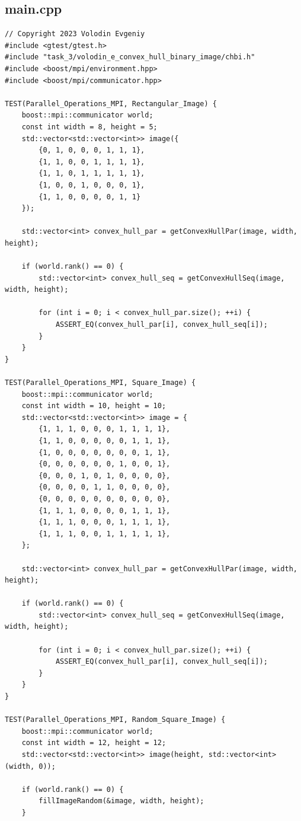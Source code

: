 \documentclass[a4paper, 12pt]{extarticle}
\begin{document}
\subsection*{main.cpp}
\begin{verbatim}
// Copyright 2023 Volodin Evgeniy
#include <gtest/gtest.h>
#include "task_3/volodin_e_convex_hull_binary_image/chbi.h"
#include <boost/mpi/environment.hpp>
#include <boost/mpi/communicator.hpp>

TEST(Parallel_Operations_MPI, Rectangular_Image) {
	boost::mpi::communicator world;
	const int width = 8, height = 5;
	std::vector<std::vector<int>> image({
		{0, 1, 0, 0, 0, 1, 1, 1},
		{1, 1, 0, 0, 1, 1, 1, 1},
		{1, 1, 0, 1, 1, 1, 1, 1},
		{1, 0, 0, 1, 0, 0, 0, 1},
		{1, 1, 0, 0, 0, 0, 1, 1}
	});
	
	std::vector<int> convex_hull_par = getConvexHullPar(image, width, height);
	
	if (world.rank() == 0) {
		std::vector<int> convex_hull_seq = getConvexHullSeq(image, width, height);
		
		for (int i = 0; i < convex_hull_par.size(); ++i) {
			ASSERT_EQ(convex_hull_par[i], convex_hull_seq[i]);
		}
	}
}

TEST(Parallel_Operations_MPI, Square_Image) {
	boost::mpi::communicator world;
	const int width = 10, height = 10;
	std::vector<std::vector<int>> image = {
		{1, 1, 1, 0, 0, 0, 1, 1, 1, 1},
		{1, 1, 0, 0, 0, 0, 0, 1, 1, 1},
		{1, 0, 0, 0, 0, 0, 0, 0, 1, 1},
		{0, 0, 0, 0, 0, 0, 1, 0, 0, 1},
		{0, 0, 0, 1, 0, 1, 0, 0, 0, 0},
		{0, 0, 0, 0, 1, 1, 0, 0, 0, 0},
		{0, 0, 0, 0, 0, 0, 0, 0, 0, 0},
		{1, 1, 1, 0, 0, 0, 0, 1, 1, 1},
		{1, 1, 1, 0, 0, 0, 1, 1, 1, 1},
		{1, 1, 1, 0, 0, 1, 1, 1, 1, 1},
	};
	
	std::vector<int> convex_hull_par = getConvexHullPar(image, width, height);
	
	if (world.rank() == 0) {
		std::vector<int> convex_hull_seq = getConvexHullSeq(image, width, height);
		
		for (int i = 0; i < convex_hull_par.size(); ++i) {
			ASSERT_EQ(convex_hull_par[i], convex_hull_seq[i]);
		}
	}
}

TEST(Parallel_Operations_MPI, Random_Square_Image) {
	boost::mpi::communicator world;
	const int width = 12, height = 12;
	std::vector<std::vector<int>> image(height, std::vector<int>(width, 0));
	
	if (world.rank() == 0) {
		fillImageRandom(&image, width, height);
	}
	

\end{verbatim}
\end{document}
